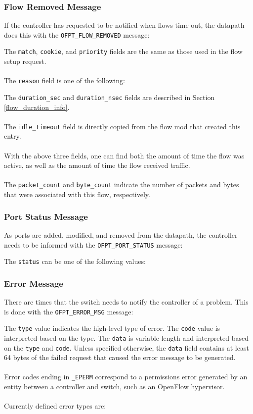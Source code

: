 
 
\subsubsection{Flow Removed Message}
If the controller has requested to be notified when flows time out, the datapath does this with the \verb|OFPT_FLOW_REMOVED| message:


The \verb|match|, \verb|cookie|, and \verb|priority| fields are the same as those used in the flow setup request.
\\\\
The \verb|reason| field is one of the following:


The \verb|duration_sec| and \verb|duration_nsec| fields are described in Section \ref{flow_duration_info}.
\\\\
The \verb|idle_timeout| field is directly copied from the flow mod that created this entry. 
\\\\
With the above three fields, one can find both the amount of time the flow was active, as well as the amount of time the flow received traffic.
\\\\
The \verb|packet_count| and \verb|byte_count| indicate the number of packets and bytes that were associated with this flow, respectively. 
 
\subsubsection{Port Status Message}
As ports are added, modified, and removed from the datapath, the controller needs to be informed with the \verb|OFPT_PORT_STATUS| message:


The \verb|status| can be one of the following values:

 

\subsubsection{Error Message}
There are times that the switch needs to notify the controller of a problem.  This is done with the \verb|OFPT_ERROR_MSG| message: 	


The \verb|type| value indicates the high-level type of error.  The \verb|code| value is interpreted based on the type.  The \verb|data| is variable length and interpreted based on the \verb|type| and \verb|code|. Unless specified otherwise, the \verb|data| field contains at least 64 bytes of the failed request that caused the error message to be generated.
\\\\
Error codes ending in \verb|_EPERM| correspond to a permissions error generated by an entity between a controller and switch, such as an OpenFlow hypervisor. 
\\\\
Currently defined error types are:

